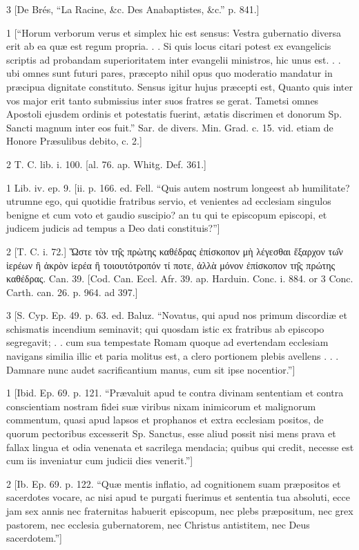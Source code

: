 3
[De Brés, “La Racine, &c. Des Anabaptistes, &c.” p. 841.]

1
[“Horum verborum verus et simplex hic est sensus: Vestra gubernatio diversa erit ab ea quæ est regum propria. . . Si quis locus citari potest ex evangelicis scriptis ad probandam superioritatem inter evangelii ministros, hic unus est. . . ubi omnes sunt futuri pares, præcepto nihil opus quo moderatio mandatur in præcipua dignitate constituto. Sensus igitur hujus præcepti est, Quanto quis inter vos major erit tanto submissius inter suos fratres se gerat. Tametsi omnes Apostoli ejusdem ordinis et potestatis fuerint, ætatis discrimen et donorum Sp. Sancti magnum inter eos fuit.” Sar. de divers. Min. Grad. c. 15. vid. etiam de Honore Præsulibus debito, c. 2.]

2
T. C. lib. i. 100. [al. 76. ap. Whitg. Def. 361.]

1
Lib. iv. ep. 9. [ii. p. 166. ed. Fell. “Quis autem nostrum longeest ab humilitate? utrumne ego, qui quotidie fratribus servio, et venientes ad ecclesiam singulos benigne et cum voto et gaudio suscipio? an tu qui te episcopum episcopi, et judicem judicis ad tempus a Deo dati constituis?”]

2
[T. C. i. 72.] Ὥστε τὸν τη̑ς πρὼτης καθέδρας ἐπίσκοπον μὴ λέγεσθαι ἔξαρχον τω̑ν ἱερέων ἢ ἀκρὸν ἱερέα ἢ τοιουτότροπόν τί ποτε, ἀλλὰ μόνον ἐπίσκοπον τη̑ς πρώτης καθέδρας. Can. 39. [Cod. Can. Eccl. Afr. 39. ap. Harduin. Conc. i. 884. or 3 Conc. Carth. can. 26. p. 964. ad 397.]

3
[S. Cyp. Ep. 49. p. 63. ed. Baluz. “Novatus, qui apud nos primum discordiæ et schismatis incendium seminavit; qui quosdam istic ex fratribus ab episcopo segregavit; . . cum sua tempestate Romam quoque ad evertendam ecclesiam navigans similia illic et paria molitus est, a clero portionem plebis avellens . . . Damnare nunc audet sacrificantium manus, cum sit ipse nocentior.”]

1
[Ibid. Ep. 69. p. 121. “Prævaluit apud te contra divinam sententiam et contra conscientiam nostram fidei suæ viribus nixam inimicorum et malignorum commentum, quasi apud lapsos et prophanos et extra ecclesiam positos, de quorum pectoribus excesserit Sp. Sanctus, esse aliud possit nisi mens prava et fallax lingua et odia venenata et sacrilega mendacia; quibus qui credit, necesse est cum iis inveniatur cum judicii dies venerit.”]

2
[Ib. Ep. 69. p. 122. “Quæ mentis inflatio, ad cognitionem suam præpositos et sacerdotes vocare, ac nisi apud te purgati fuerimus et sententia tua absoluti, ecce jam sex annis nec fraternitas habuerit episcopum, nec plebs præpositum, nec grex pastorem, nec ecclesia gubernatorem, nec Christus antistitem, nec Deus sacerdotem.”]

